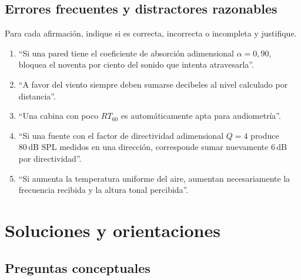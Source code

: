 \subsection*{Errores frecuentes y distractores razonables}

Para cada afirmación, indique si es correcta, incorrecta o incompleta y
justifique.

\begin{enumerate}[label=\textbf{D\arabic*.},leftmargin=*]
    \item ``Si una pared tiene el coeficiente de absorción adimensional
    \(\alpha=0{,}90\), bloquea el noventa por ciento del sonido que intenta
    atravesarla''.
    \item ``A favor del viento siempre deben sumarse decibeles al nivel
    calculado por distancia''.
    \item ``Una cabina con poco \(RT_{60}\) es automáticamente apta para
    audiometría''.
    \item ``Si una fuente con el factor de directividad adimensional \(Q=4\)
    produce \(80\,\text{dB SPL}\) medidos en una dirección, corresponde sumar
    nuevamente \(6\,\text{dB}\) por directividad''.
    \item ``Si aumenta la temperatura uniforme del aire, aumentan
    necesariamente la frecuencia recibida y la altura tonal percibida''.
\end{enumerate}

\section{Soluciones y orientaciones}
\label{sec:u9-soluciones}

\subsection*{Preguntas conceptuales}

